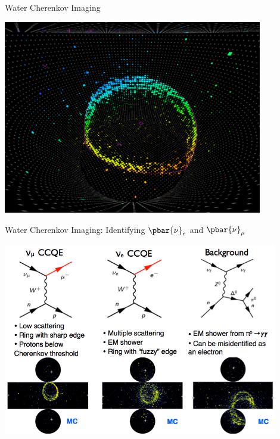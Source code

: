 %
%
%
\begin{frame}{Water Cherenkov Imaging}

  \begin{center}
   \includegraphics[width=0.85\textwidth]{./images/3nu/accelerator/t2k/superk_3d_event_display}
  \end{center}

\end{frame}

%
%
%
\begin{frame}{Water Cherenkov Imaging: Identifying $\pbar{\nu}_{e}$ and  $\pbar{\nu}_{\mu}$}

\begin{center}
  \includegraphics[width=0.90\textwidth]{./images/3nu/accelerator/t2k/event_displays_1mu_1e_bkg}
\end{center}

\end{frame}

